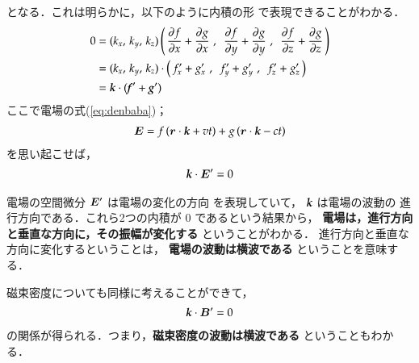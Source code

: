             となる．これは明らかに，以下のように内積の形
            で表現できることがわかる．
            \begin{align*}
            0&=(k_{x},\,k_{y},\,k_{z})\left(\, \frac{\partial f}{\partial x}+\frac{\partial g}{\partial x}\,\,,\,\,\,
            \frac{\partial f}{\partial y}+\frac{\partial g}{\partial y}\,\,,\,\,\,
            \frac{\partial f}{\partial z}+\frac{\partial g}{\partial z}\,
            \right)\notag \\
            &=(k_{x},\,k_{y},\,k_{z})\cdot\left(\, f_{x}'+g_{x}'\,\,,\,\,\,
            f_{y}'+g_{y}'\,\,,\,\,\,
            f_{z}'+g_{z}'\,\right)
            \notag \\
            &=\textbf{\textit{k}}\cdot(\textbf{\textit{f}}'+\textbf{\textit{g}}')
            \end{align*}
            ここで電場の式(\ref{eq:denbaba})；
            \begin{align*}
                \boldsymbol{E}=f\left(\boldsymbol{r}\cdot\textit{\textbf{k}}+vt\right) + g\left(\boldsymbol{r}\cdot\textit{\textbf{k}}-ct\right)
            \end{align*}
            を思い起こせば，
            \begin{align}
                \textbf{\textit{k}}\cdot\boldsymbol{E}'=0
            \end{align}

            電場の空間微分 $\boldsymbol{E}'$ は電場の変化の方向
            を表現していて， $\textbf{\textit{k}}$ は電場の波動の
            進行方向である．これら2つの内積が 0 であるという結果から，
            \textbf{電場は，進行方向と垂直な方向に，その振幅が変化する} ということがわかる．
            進行方向と垂直な方向に変化するということは，
            \textbf{電場の波動は横波である} ということを意味する．

            磁束密度についても同様に考えることができて，
            \begin{align}
            \textbf{\textit{k}}\cdot\boldsymbol{B}'=0
            \end{align}
            の関係が得られる．つまり，\textbf{磁束密度の波動は横波である} ということもわかる．


